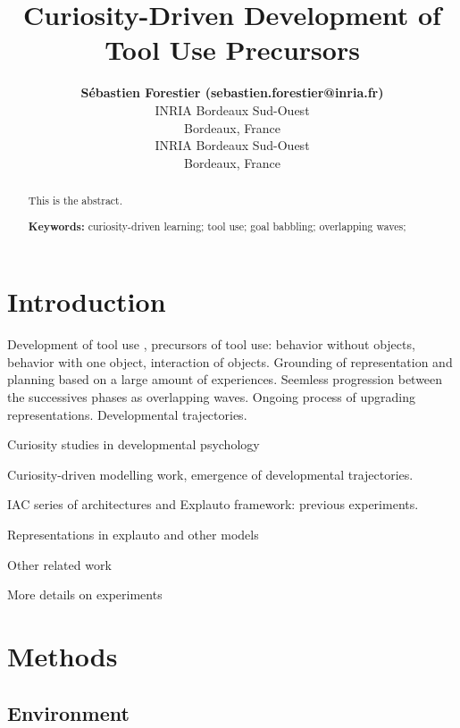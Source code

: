 \documentclass[10pt,letterpaper]{article}
\title{Curiosity-Driven Development of Tool Use Precursors}
\author{{\large \bf S\'ebastien Forestier (sebastien.forestier@inria.fr)} \\
	INRIA Bordeaux Sud-Ouest\\
	Bordeaux, France
  \AND {\large \bf Pierre-Yves Oudeyer (pierre-yves.oudeyer@inria.fr} \\
	INRIA Bordeaux Sud-Ouest\\
	Bordeaux, France}
\begin{document}
\maketitle


\begin{abstract}
This is the abstract.

\textbf{Keywords:} 
curiosity-driven learning; tool use; goal babbling; overlapping waves; 
\end{abstract}


\section{Introduction}

	Development of tool use \cite{guerin2013survey}, precursors of tool use: behavior without objects, behavior with one object, interaction of objects.	
	Grounding of representation and planning based on a large amount of experiences. 	
	Seemless progression between the successives phases as overlapping waves. 	
	Ongoing process of upgrading representations.	
	Developmental trajectories.
	
	
	Curiosity studies in developmental psychology 
	\cite{kidd}
	\cite{gottlieb_information-seeking_2013}
	
	Curiosity-driven modelling work, emergence of developmental trajectories.
	\cite{oudeyer_intrinsic_2007} 
	\cite{oudeyer_what_2007}
	\cite{flow}
	\cite{sch}
	\cite{santucci2013}
	\cite{cangelosi2010integration}
	\cite{oudeyer2014evolution}
	
	
	IAC series of architectures and Explauto framework: previous experiments.
	\cite{moulin-frier_self-organization_2014}
	\cite{moulin-frier_explauto:_2014}
	\cite{baranes2010intrinsically}
	\cite{riac}
	\cite{baranes_active_2013}
	
	Representations in explauto and other models 
	\cite{mugan2009}
	\cite{metzen2013}
	\cite{horde}
	\cite{mugan}
	\cite{vig}
	\cite{sutton1999between}
	
	Other related work
	\cite{ugur2015}
	\cite{schmerlinggoal}

	More details on experiments
	\cite{ijspeert_dynamical_2013}
	
	\cite{}
	
%

\section{Methods}

	\subsection{Environment}
	
\end{document}
